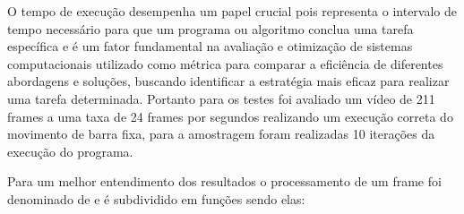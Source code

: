 O tempo de execução desempenha um papel crucial pois representa o intervalo de tempo necessário para que um programa ou algoritmo conclua uma tarefa específica e é um fator fundamental na avaliação e otimização de sistemas computacionais utilizado como métrica para comparar a eficiência de diferentes abordagens e soluções, buscando identificar a estratégia mais eficaz para realizar uma tarefa determinada. Portanto para os testes foi avaliado um vídeo de 211 frames a uma taxa de 24 frames por segundos realizando um execução correta do movimento de barra fixa, para a amostragem foram realizadas 10 iterações da execução do programa.


\newpage
Para um melhor entendimento dos resultados o processamento de um frame foi denominado de  e é subdividido em funções sendo elas:


